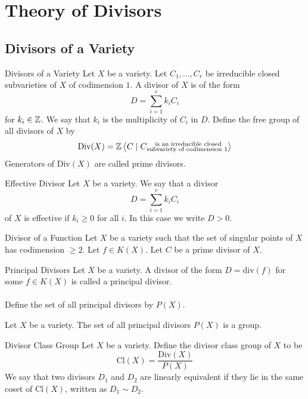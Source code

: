 \documentclass[a4paper]{article}
\begin{document}
\pagebreak
\section{Theory of Divisors}
\subsection{Divisors of a Variety}
\begin{defn}{Divisors of a Variety}{} Let $X$ be a variety. Let $C_1,\dots,C_r$ be irreducible closed subvarieties of $X$ of codimension $1$. A divisor of $X$ is of the form $$D=\sum_{i=1}^rk_iC_i$$ for $k_i\in\mathbb{Z}$. We say that $k_i$ is the multiplicity of $C_i$ in $D$. Define the free group of all divisors of $X$ by $$\text{Div}(X)=\mathbb{Z}\left\langle C\;|\;C\substack{\text{ is an irreducible closed}\\\text{subvariety of codimension }1}\right\rangle$$ Generators of $\text{Div}(X)$ are called prime divisors. 
\end{defn}

\begin{defn}{Effective Divisor}{} Let $X$ be a variety. We say that a divisor $$D=\sum_{i=1}^rk_iC_i$$ of $X$ is effective if $k_i\geq 0$ for all $i$. In this case we write $D>0$. 
\end{defn}

\begin{defn}{Divisor of a Function}{} Let $X$ be a variety such that the set of singular points of $X$ has codimension $\geq 2$. Let $f\in K(X)$. Let $C$ be a prime divisor of $X$. 
\end{defn}

\begin{defn}{Principal Divisors}{} Let $X$ be a variety. A divisor of the form $D=\text{div}(f)$ for some $f\in K(X)$ is called a principal divisor. \\~\\
Define the set of all principal divisors by $P(X)$. 
\end{defn}

\begin{prp}{}{} Let $X$ be a variety. The set of all principal divisors $P(X)$ is a group. 
\end{prp}

\begin{defn}{Divisor Class Group}{} Let $X$ be a variety. Define the divisor class group of $X$ to be $$\text{Cl}(X)=\frac{\text{Div}(X)}{P(X)}$$
We say that two divisors $D_1$ and $D_2$ are linearly equivalent if they lie in the same coset of $\text{Cl}(X)$, written as $D_1\sim D_2$. 
\end{defn}
\end{document}
